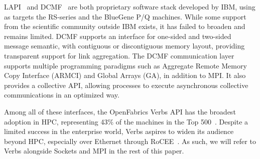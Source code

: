 LAPI~\cite{lapi_a_1998} and DCMF~\cite{Kumar:2008:DCM:1375527.1375544}
are both proprietary software stack developed by IBM, using as targets
the RS-series and the BlueGene P/Q machines. While some support
from the scientific community outside IBM exists, it has failed to
broaden and remains limited. DCMF supports an
interface for one-sided and two-sided message semantic, with
contiguous or discontiguous memory layout, providing transparent support 
for link aggregation. The DCMF communication layer supports 
multiple programming paradigms such as Aggregate Remote Memory Copy Interface 
(ARMCI) and Global Arrays (GA), in addition to MPI. It also provides 
a collective API, allowing processes to execute asynchronous collective
communications in an optimized way.

Among all of these interfaces, the OpenFabrics Verbs API has the broadest adoption in HPC, 
representing 43\% of the machines in the Top 500~\cite{top500}. Despite 
a limited success in the enterprise world, Verbs aspires to widen its audience 
beyond HPC, especially over Ethernet through RoCEE~\cite{RoCEE}. As such, we 
will refer to Verbs alongside Sockets and MPI in the rest of this paper.

